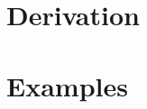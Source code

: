\documentclass[11pt,twoside,a5paper]{book}
\begin{document}

\clearpage
\tableofcontents
\listoffigures
\clearpage
\chapter{Derivation}

\clearpage
\chapter{Examples}

\clearpage
{}
\printindex
\end{document}
